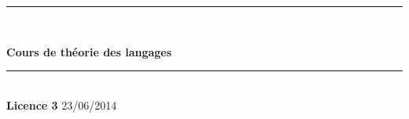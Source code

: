 \documentclass[11pt,twoside,openright,a4paper]{report}
\begin{document}
\begin{titlepage}
\begin{Large}
\baselineskip=7mm
\noindent
\hfill

\begin{center}
\rule{\textwidth}{0.5 mm}\\
{\huge\sffamily\bfseries\baselineskip=1cm
Cours de théorie des langages
\par}
\rule{\textwidth}{0.5 mm}\\
{\Large\sffamily\bfseries Licence 3}
\vskip 5mm
23/06/2014
\end{center}

\vfill

\end{Large}
\end{titlepage}

\cleardoublepage

\tableofcontents

\pagestyle{fancy}

% 



\end{document}
